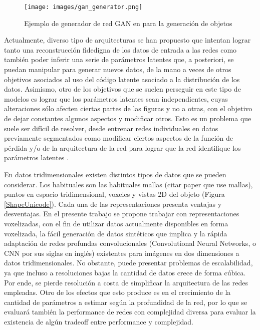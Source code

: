 \documentclass[spanish]{article}
\begin{document}
\begin{figure}[h]
\texttt{[image: images/gan\_generator.png]}
\centering
\caption{Ejemplo de generador de red GAN en \cite{Wu2016} para la generación de objetos}
\label{GAN}
\end{figure}

Actualmente, diverso tipo de arquitecturas se han propuesto \cite{Gao2019, Park2019, Olszewski2019, Li2019, Muralikrishnan2019, Yin2019} que intentan lograr tanto una reconstrucción fidedigna de los datos de entrada a las redes como también poder inferir una serie de parámetros latentes que, a posteriori, se puedan manipular para generar nuevos datos, de la mano a veces de otros objetivos asociados al uso del código latente asociado a la distribución de los datos. Asimismo, otro de los objetivos que se suelen perseguir en este tipo de modelos es lograr que los parámetros latentes sean independientes, cuyas alteraciones sólo afecten ciertas partes de las figuras y no a otras, con el objetivo de dejar constantes algunos aspectos y modificar otros. Esto es un problema que suele ser difícil de resolver, desde entrenar redes individuales en datos previamente segmentados \cite{Li2019} como modificar ciertos aspectos de la función de pérdida y/o de la arquitectura de la red para lograr que la red identifique los parámetros latentes \cite{Yin2019, Higgins2017}.

En datos tridimensionales existen distintos tipos de datos que se pueden considerar. Los habituales son las habituales mallas (citar paper que use mallas), puntos en espacio tridimensional, voxeles y vistas 2D del objeto \cite{Muralikrishnan2019} (Figura \ref{ShapeUnicode}). Cada una de las representaciones presenta ventajas y desventajas. En el presente trabajo se propone trabajar con representaciones voxelizadas, con el fin de utilizar datos actualmente disponibles en forma voxelizada, la fácil generación de datos sintéticos que implica y la rápida adaptación de redes profundas convolucionales (Convolutional Neural Networks, o CNN por sus siglas en inglés) existentes para imágenes en dos dimensiones a datos tridimensionales. No obstante, puede presentar problemas de escalabilidad, ya que incluso a resoluciones bajas la cantidad de datos crece de forma cúbica. Por ende, se pierde resolución a costa de simplificar la arquitectura de las redes empleadas. Otro de los efectos que esto produce es en el crecimiento de la cantidad de parámetros a estimar según la profundidad de la red, por lo que se evaluará también la performance de redes con complejidad diversa para evaluar la existencia de algún tradeoff entre performance y complejidad.
\end{document}
